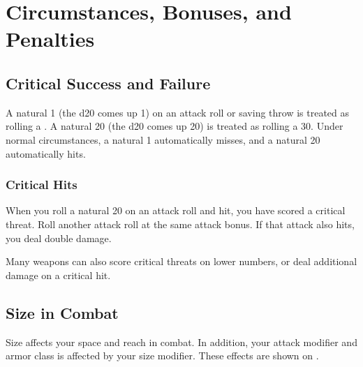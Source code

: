 \section{Circumstances, Bonuses, and Penalties}

\subsection{Critical Success and Failure}
A natural 1 (the d20 comes up 1) on an attack roll or saving throw is treated as rolling a . A natural 20 (the d20 comes up 20) is treated as rolling a 30. Under normal circumstances, a natural 1 automatically misses, and a natural 20 automatically hits.

\subsubsection{Critical Hits}
When you roll a natural 20 on an attack roll and hit, you have scored a critical threat. Roll another attack roll at the same attack bonus. If that attack also hits, you deal double damage.

Many weapons can also score critical threats on lower numbers, or deal additional damage on a critical hit.

\subsection{Size in Combat}
Size affects your space and reach in combat. In addition, your attack modifier and armor class is affected by your size modifier. These effects are shown on . 

